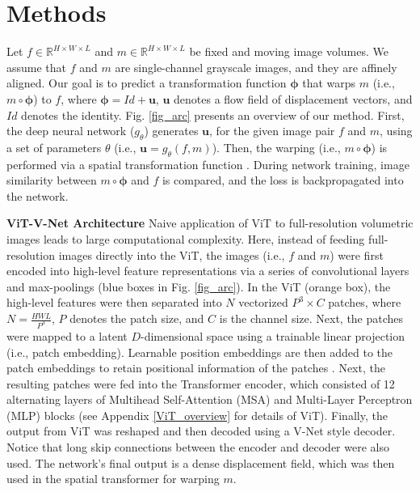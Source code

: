 \documentclass{midl}
\begin{document}
\vspace{-5mm}
\section{Methods}
\vspace{-1mm}
Let $f\in\mathbb{R}^{H\times W\times L}$ and $m\in\mathbb{R}^{H\times W\times L}$ be fixed and moving image volumes. We assume that $f$ and $m$ are single-channel grayscale images, and they are affinely aligned. Our goal is to predict a transformation function $\mathbf{\phi}$ that warps $m$ (i.e., $m\circ\mathbf{\phi}$) to $f$, where $\mathbf{\phi}=Id+\mathbf{u}$, $\mathbf{u}$ denotes a flow field of displacement vectors, and $Id$ denotes the identity. Fig. \ref{fig_arc} presents an overview of our method. First, the deep neural network ($g_\theta$) generates $\mathbf{u}$, for the given image pair $f$ and $m$, using a set of parameters $\theta$ (i.e., $\mathbf{u} = g_\theta(f,m)$). Then, the warping (i.e., $m\circ\mathbf{\phi}$) is performed via a spatial transformation function \cite{jaderberg2015spatial}. During network training, image similarity between $m\circ\mathbf{\phi}$ and $f$ is compared, and the loss is backpropagated into the network.

\noindent\textbf{ViT-V-Net Architecture} 
Naive application of ViT to full-resolution volumetric images leads to large computational complexity. Here, instead of feeding full-resolution images directly into the ViT, the images (i.e., $f$ and $m$) were first encoded into high-level feature representations via a series of convolutional layers and max-poolings (blue boxes in Fig. \ref{fig_arc}). In the ViT (orange box), the high-level features were then separated into $N$ vectorized $P^3\times C$ patches, where $N=\frac{HWL}{P^3}$, $P$ denotes the patch size, and $C$ is the channel size. Next, the patches were mapped to a latent $D$-dimensional space using a trainable linear projection (i.e., patch embedding). Learnable position embeddings are then added to the patch embeddings to retain positional information of the patches \cite{dosovitskiy2020image}. Next, the resulting patches were fed into the Transformer encoder, which consisted of 12 alternating layers of Multihead Self-Attention (MSA) and Multi-Layer Perceptron (MLP) blocks \cite{vaswani2017attention} (see Appendix \ref{ViT_overview} for details of ViT). Finally, the output from ViT was reshaped and then decoded using a V-Net style decoder. Notice that long skip connections between the encoder and decoder were also used. The network's final output is a dense displacement field, which was then used in the spatial transformer for warping $m$.
\end{document}
